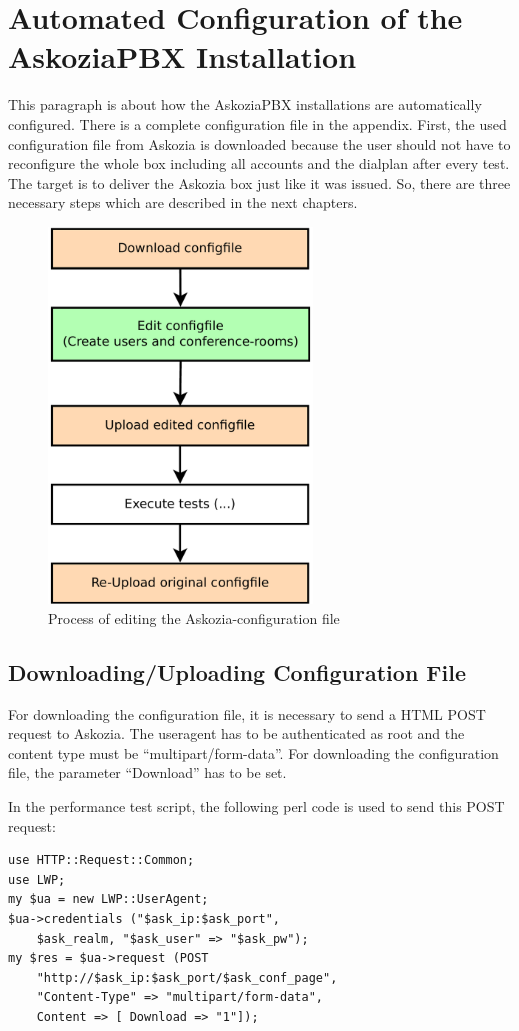 \section{Automated Configuration of the AskoziaPBX Installation}
\label{sec:configuration}
This paragraph is about how the AskoziaPBX installations are automatically configured.
There is a complete configuration file in the appendix. First, the used configuration file
from Askozia is downloaded because the user should not have to reconfigure the whole box
including all accounts and the dialplan after every test. The target is to deliver
the Askozia box just like it was issued. So, there are three necessary steps which are described in the next chapters.
\begin{figure} [htbp]
\centering
\includegraphics [width=7cm] {config-1}
\caption{Process of editing the Askozia-configuration file}
\end{figure}

\subsection{Downloading/Uploading Configuration File}%
For downloading the configuration file, it is necessary to send a HTML POST request to Askozia.
The useragent has to be authenticated as root and the content type must be ``multipart/form-data''.
For downloading the configuration file, the parameter ``Download'' has to be set.

\newpage In the performance test script, the following perl code is used to send this POST request:
\begin{lstlisting}[breaklines=true,label=code:config-post-request-download,caption={POST request for downloading the configuration file} ]
use HTTP::Request::Common;
use LWP;
my $ua = new LWP::UserAgent;
$ua->credentials ("$ask_ip:$ask_port",
	$ask_realm, "$ask_user" => "$ask_pw");
my $res = $ua->request (POST
	"http://$ask_ip:$ask_port/$ask_conf_page",
	"Content-Type" => "multipart/form-data",
	Content => [ Download => "1"]);
\end{lstlisting}

